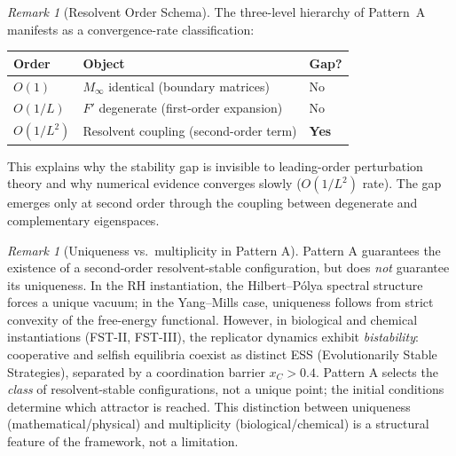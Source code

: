 \documentclass[12pt,a4paper]{article}
\theoremstyle{definition}
\theoremstyle{remark}
\newtheorem{remark}[theorem]{Remark}
\begin{document}
\begin{remark}[Resolvent Order Schema]
\label{rem:order-schema}
The three-level hierarchy of Pattern~A manifests as a convergence-rate classification:
\medskip

\begin{center}
\begin{tabular}{lll}
\hline
\textbf{Order} & \textbf{Object} & \textbf{Gap?} \\
\hline
$O(1)$       & $M_\infty$ identical (boundary matrices) & No \\
$O(1/L)$     & $F'$ degenerate (first-order expansion) & No \\
$O(1/L^2)$   & Resolvent coupling (second-order term) & \textbf{Yes} \\
\hline
\end{tabular}
\end{center}

\medskip
\noindent
This explains why the stability gap is invisible to leading-order perturbation theory and why numerical evidence converges slowly ($O(1/L^2)$ rate). The gap emerges only at second order through the coupling between degenerate and complementary eigenspaces.
\end{remark}

\begin{remark}[Uniqueness vs.\ multiplicity in Pattern A]
\label{rem:uniqueness-multiplicity}
Pattern A guarantees the existence of a second-order resolvent-stable configuration, but does \textit{not} guarantee its uniqueness. In the RH instantiation, the Hilbert--P\'olya spectral structure~\cite{Conrey2003} forces a unique vacuum; in the Yang--Mills case, uniqueness follows from strict convexity of the free-energy functional. However, in biological and chemical instantiations (FST-II, FST-III), the replicator dynamics exhibit \textit{bistability}: cooperative and selfish equilibria coexist as distinct ESS (Evolutionarily Stable Strategies), separated by a coordination barrier $x_C > 0.4$. Pattern A selects the \textit{class} of resolvent-stable configurations, not a unique point; the initial conditions determine which attractor is reached. This distinction between uniqueness (mathematical/physical) and multiplicity (biological/chemical) is a structural feature of the framework, not a limitation.
\end{remark}
\end{document}

